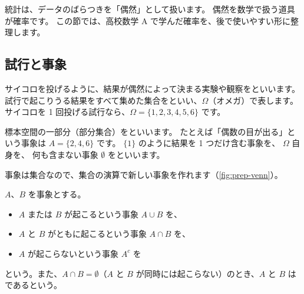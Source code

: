 統計は、データのばらつきを「偶然」として扱います。
偶然を数学で扱う道具が確率です。
この節では、高校数学 A で学んだ確率を、後で使いやすい形に整理します。

\subsection{試行と事象}

サイコロを投げるように、結果が偶然によって決まる実験や観察をといいます。
試行で起こりうる結果をすべて集めた集合をといい、$\Omega$（オメガ）で表します。
サイコロを 1 回投げる試行なら、$\Omega = \{1, 2, 3, 4, 5, 6\}$ です。

標本空間の一部分（部分集合）をといいます。
たとえば「偶数の目が出る」という事象は $A = \{2, 4, 6\}$ です。
$\{1\}$ のように結果を 1 つだけ含む事象を、
$\Omega$ 自身を、
何も含まない事象 $\emptyset$ をといいます。

事象は集合なので、集合の演算で新しい事象を作れます（\cref{fig:prep-venn}）。

\begin{definition}
  $A$、$B$ を事象とする。
  \begin{itemize}
    \item $A$ または $B$ が起こるという事象 $A \cup B$ を、
    \item $A$ と $B$ がともに起こるという事象 $A \cap B$ を、
    \item $A$ が起こらないという事象 $A^c$ を
  \end{itemize}
  という。また、$A \cap B = \emptyset$（$A$ と $B$ が同時には起こらない）のとき、$A$ と $B$ はであるという。
\end{definition}

